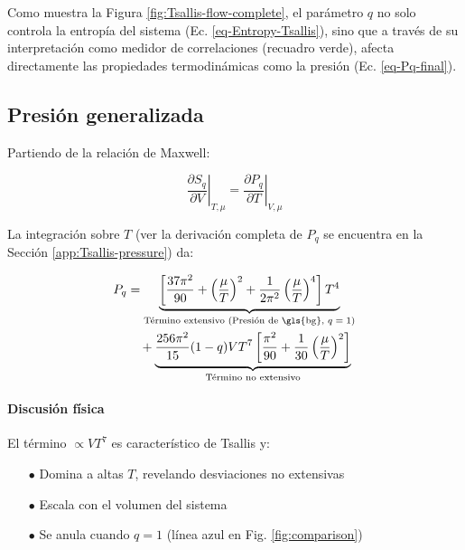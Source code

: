 Como muestra la Figura \ref{fig:Tsallis-flow-complete}, el parámetro $q$ no solo controla la entropía del sistema (Ec. \ref{eq-Entropy-Tsallis}), sino que a través de su interpretación como medidor de correlaciones (recuadro verde), afecta directamente las propiedades termodinámicas como la presión (Ec. \ref{eq-Pq-final}).

\subsection{Presión generalizada}\label{subsec-Tsallis-pressure}

Partiendo de la relación de Maxwell:

\begin{equation}\label{eq-Maxwell-Tsallis}
    \left.\frac{\partial{S}_q}{\partial V}\right|_{T,\mu} = \left.\frac{\partial{P}_q}{\partial T}\right|_{V,\mu}
\end{equation}

La integración sobre $T$ (ver la derivación completa de $P_q$ se encuentra en la Sección \ref{app:Tsallis-pressure}) da:

\begin{equation}\label{eq-Pq-final}
    \begin{split}
    {P}_q &= \underbrace{\left[\frac{37\pi^2}{90} + \left(\frac{\mu}{T}\right)^2 + \frac{1}{2\pi^2}\left(\frac{\mu}{T}\right)^4\right]T^4}_{\text{Término extensivo (Presión de \gls{bg}, $q=1$)}} \\
    &\quad + \underbrace{\frac{256\pi^2}{15}(1-q)V T^7 \left[\frac{{\pi}^{2}}{90} + \frac{1}{30} \left(\frac{\mu}{T} \right)^{2} \right]}_{\text{Término no extensivo}}
    \end{split}
\end{equation}

\paragraph{Discusión física}  
El término $\propto V T^7$ es característico de Tsallis y:
\begin{itemize}
    \item[$\bullet$] Domina a altas $T$, revelando desviaciones no extensivas
    \item[$\bullet$] Escala con el volumen del sistema
    \item[$\bullet$] Se anula cuando $q=1$ (línea azul en Fig. \ref{fig:comparison})
\end{itemize}

